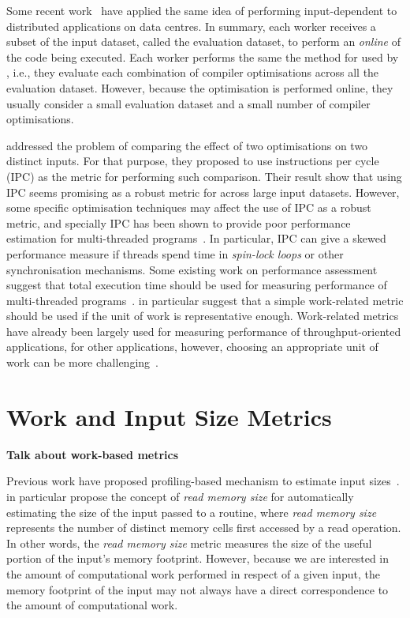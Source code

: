 Some recent work~\citep{chen12b,fang15} have applied the same idea of performing input-dependent {\itercomp} to distributed applications on data centres.
In summary, each worker receives a subset of the input dataset, called the evaluation dataset, to perform an \textit{online} {\itercomp} of the code being executed.
Each worker performs the same the method for {\itercomp} used by \cite{chen10,chen12a}, i.e., they evaluate each combination of compiler optimisations across all the evaluation dataset.
However, because the optimisation is performed online, they usually consider a small evaluation dataset and a small number of compiler optimisations.

\cite{fursin07} addressed the problem of comparing the effect of two optimisations on two distinct inputs.
For that purpose, they proposed to use instructions per cycle (IPC) as the metric for performing such comparison.
Their result show that using IPC seems promising as a robust metric for {\itercomp} across large input datasets.
However, some specific optimisation techniques may affect the use of IPC as a robust metric, and specially IPC has been shown to provide poor performance estimation for multi-threaded programs~\citep{alameldeen06,eyerman08}.
In particular, IPC can give a skewed performance measure if threads spend time in \textit{spin-lock loops} or other synchronisation mechanisms. 
Some existing work on performance assessment suggest that total execution time should be used for measuring performance of multi-threaded programs~\citep{alameldeen06,eyerman08}.
\cite{alameldeen06} in particular suggest that a simple work-related metric should be used if the unit of work is representative enough.
Work-related metrics have already been largely used for measuring performance of throughput-oriented applications, for other applications, however, choosing an appropriate unit of work can be more challenging~\citep{alameldeen06}.

\section{Work and Input Size Metrics}

\textbf{Talk about work-based metrics}

\citep{mcgeoch07}

Previous work have proposed profiling-based mechanism to estimate input sizes~\citep{zaparanuks12,coppa14}.
\cite{coppa14} in particular propose the concept of \textit{read memory size} for automatically estimating the size of the input passed to a routine, where \textit{read memory size} represents the number of distinct memory cells first accessed by a read operation.
In other words, the \textit{read memory size} metric measures the size of the useful portion of the input's memory footprint.
However, because we are interested in the amount of computational work performed in respect of a given input, the memory footprint of the input may not always have a direct correspondence to  the amount of computational work.

